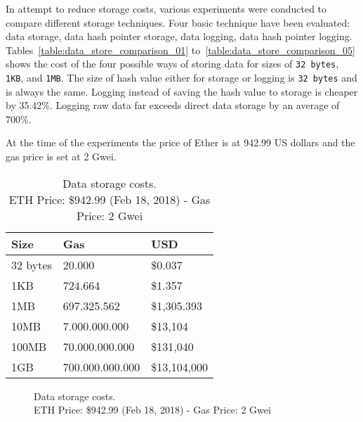 In attempt to reduce storage costs, various experiments were conducted to compare different storage techniques. Four basic technique have been evaluated: data storage, data hash pointer storage, data logging, data hash pointer logging. Tables~\ref{table:data_store_comparison_01} to~\ref{table:data_store_comparison_05} shows the cost of the four possible ways of storing data for sizes of \verb|32 bytes|, \verb|1KB|, and \verb|1MB|. The size of hash value either for storage or logging is \verb|32 bytes| and is always the same. Logging instead of saving the hash value to storage is cheaper by 35.42\%. Logging raw data far exceeds direct data storage by an average of 700\%.

At the time of the experiments the price of Ether is at 942.99 US dollars and the gas price is set at 2 Gwei.

\begin{table}[!htb]
\centering
\begin{tabular}{|l|l|l|}
\hline
 Size & Gas  & USD \\ \hline
 32 bytes & 20.000  & \$0.037 \\ \hline
 1KB & 724.664  & \$1.357 \\ \hline
 1MB & 697.325.562  & \$1,305.393 \\ \hline
 10MB & 7.000.000.000  & \$13,104 \\ \hline
 100MB & 70.000.000.000  & \$131,040 \\ \hline
 1GB & 700.000.000.000  & \$13,104,000 \\ \hline
\end{tabular}
\captionsetup{format=hang, justification=centering}
\caption{Data storage costs.\\ ETH Price: \$942.99 (Feb 18, 2018) - Gas Price: 2 Gwei}
\label{table:bytes_usd_cost}
\end{table}

\begin{figure}[!htb]
  \centering
  \captionsetup{format=hang, justification=centering}
  \caption{Data storage costs.\\ ETH Price: \$942.99 (Feb 18, 2018) - Gas Price: 2 Gwei}
  \label{fig:bytes_usd_cost}
\end{figure}

